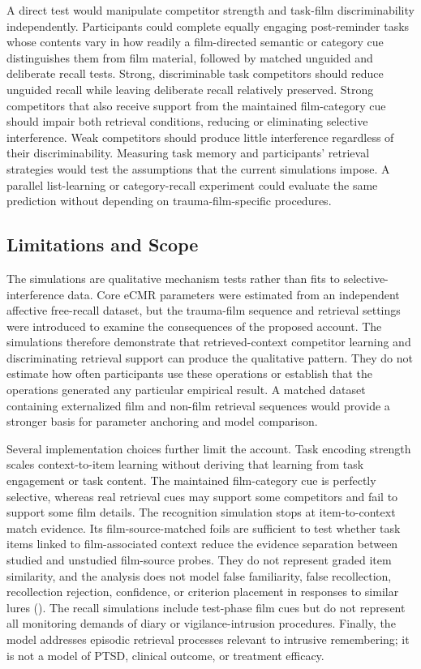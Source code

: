 \documentclass[
  man,
  floatsintext,
  longtable,
  nolmodern,
  notxfonts,
  notimes,
  draftfirst,
  colorlinks=true,linkcolor=blue,citecolor=blue,urlcolor=blue]{apa7}
\begin{document}
A direct test would manipulate competitor strength and task-film
discriminability independently. Participants could complete equally
engaging post-reminder tasks whose contents vary in how readily a
film-directed semantic or category cue distinguishes them from film
material, followed by matched unguided and deliberate recall tests.
Strong, discriminable task competitors should reduce unguided recall
while leaving deliberate recall relatively preserved. Strong competitors
that also receive support from the maintained film-category cue should
impair both retrieval conditions, reducing or eliminating selective
interference. Weak competitors should produce little interference
regardless of their discriminability. Measuring task memory and
participants' retrieval strategies would test the assumptions that the
current simulations impose. A parallel list-learning or category-recall
experiment could evaluate the same prediction without depending on
trauma-film-specific procedures.

\subsection{Limitations and Scope}\label{limitations-and-scope}

The simulations are qualitative mechanism tests rather than fits to
selective-interference data. Core eCMR parameters were estimated from an
independent affective free-recall dataset, but the trauma-film sequence
and retrieval settings were introduced to examine the consequences of
the proposed account. The simulations therefore demonstrate that
retrieved-context competitor learning and discriminating retrieval
support can produce the qualitative pattern. They do not estimate how
often participants use these operations or establish that the operations
generated any particular empirical result. A matched dataset containing
externalized film and non-film retrieval sequences would provide a
stronger basis for parameter anchoring and model comparison.

Several implementation choices further limit the account. Task encoding
strength scales context-to-item learning without deriving that learning
from task engagement or task content. The maintained film-category cue
is perfectly selective, whereas real retrieval cues may support some
competitors and fail to support some film details. The recognition
simulation stops at item-to-context match evidence. Its
film-source-matched foils are sufficient to test whether task items
linked to film-associated context reduce the evidence separation between
studied and unstudied film-source probes. They do not represent graded
item similarity, and the analysis does not model false familiarity,
false recollection, recollection rejection, confidence, or criterion
placement in responses to similar lures
(). The recall
simulations include test-phase film cues but do not represent all
monitoring demands of diary or vigilance-intrusion procedures. Finally,
the model addresses episodic retrieval processes relevant to intrusive
remembering; it is not a model of PTSD, clinical outcome, or treatment
efficacy.
\end{document}
